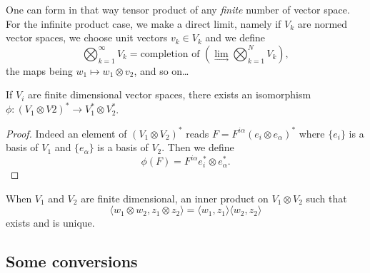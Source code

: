 One can form in that way tensor product of any \emph{finite} number of vector space. For the infinite product case, we make a direct limit, namely if $V_k$ are normed vector spaces, we choose unit vectors $v_k\in V_k$ and we define
\begin{equation}
	\bigotimes_{k=1}^{\infty} V_k=\text{completion of }\left(\lim_{\rightarrow}\bigotimes_{k=1}^N V_k\right),
\end{equation}
the maps being $w_1\mapsto w_1\otimes v_2$, and so on\ldots

\begin{lemma}
	If $V_i$ are finite dimensional vector spaces, there exists an isomorphism $\phi\colon (V_1\otimes V2)^*\to V_1^*\otimes V_2^*$.
\end{lemma}
\begin{proof}
	Indeed an element of $(V_1\otimes V_2)^*$ reads $F=F^{i\alpha}(e_i\otimes e_{\alpha})^*$ where $\{ e_i \}$ is a basis of $V_1$ and $\{ e_{\alpha} \}$ is a basis of $V_2$. Then we define
	\[
		\phi(F)=F^{i\alpha}e_i^*\otimes e_{\alpha}^*.
	\]
\end{proof}

\begin{lemma}
	When $V_1$ and $V_2$ are finite dimensional, an inner product on $V_1\otimes V_2$ such that
	\[
		\langle w_1\otimes w_2, z_1\otimes z_2\rangle =\langle w_1, z_1\rangle \langle w_2, z_2\rangle
	\]
	exists and is unique.
\end{lemma}

\subsection{Some conversions}
\label{SUBSECooAASYooVHZEhz}

